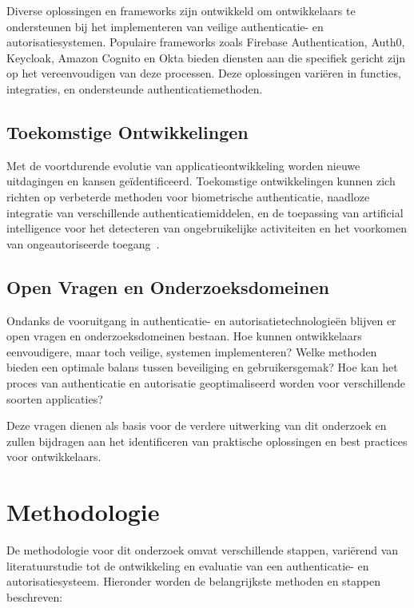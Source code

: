 Diverse oplossingen en frameworks zijn ontwikkeld om ontwikkelaars te ondersteunen bij het implementeren van veilige authenticatie- en autorisatiesystemen.
Populaire frameworks zoals Firebase Authentication, Auth0, Keycloak, Amazon Cognito en Okta bieden diensten aan die specifiek gericht zijn op het vereenvoudigen van deze
processen. Deze oplossingen variëren in functies, integraties, en ondersteunde authenticatiemethoden.

\subsection{Toekomstige Ontwikkelingen}

Met de voortdurende evolutie van applicatieontwikkeling worden nieuwe uitdagingen en kansen geïdentificeerd. Toekomstige ontwikkelingen kunnen zich
richten op verbeterde methoden voor biometrische authenticatie, naadloze integratie van verschillende authenticatiemiddelen, en de toepassing van
artificial intelligence voor het detecteren van ongebruikelijke activiteiten en het voorkomen van ongeautoriseerde toegang~\autocite{Annadurai2022}.

\subsection{Open Vragen en Onderzoeksdomeinen}

Ondanks de vooruitgang in authenticatie- en autorisatietechnologieën blijven er open vragen en onderzoeksdomeinen bestaan. Hoe kunnen ontwikkelaars
eenvoudigere, maar toch veilige, systemen implementeren? Welke methoden bieden een optimale balans tussen beveiliging en gebruikersgemak? Hoe kan
het proces van authenticatie en autorisatie geoptimaliseerd worden voor verschillende soorten applicaties?

Deze vragen dienen als basis voor de verdere uitwerking van dit onderzoek en zullen bijdragen aan het identificeren van praktische oplossingen en
best practices voor ontwikkelaars.

\section{Methodologie}%
\label{sec:methodologie}

De methodologie voor dit onderzoek omvat verschillende stappen, variërend van literatuurstudie tot de ontwikkeling en evaluatie van een 
authenticatie- en autorisatiesysteem. Hieronder worden de belangrijkste methoden en stappen beschreven:

